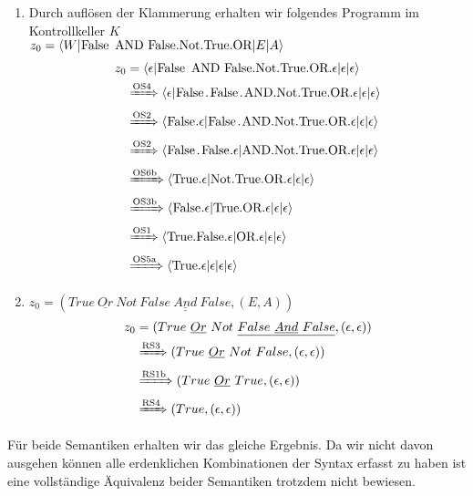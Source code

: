 \documentclass[ngerman,a4paper]{report}
\begin{document}
\begin{enumerate}
\begin{enumerate}
\item Durch auflösen der Klammerung erhalten wir folgendes Programm im Kontrollkeller $K$\\
$z_0=\langle W|\text{\lstinline!False AND False.Not.True.OR!}|E|A\rangle$
\begin{align*}
z_0&=\langle \epsilon|\text{\lstinline!False AND False.Not.True.OR!}.\epsilon|\epsilon|\epsilon\rangle \\
&\xRightarrow{\text{OS4}} \langle \epsilon|\text{\lstinline!False.False.AND.Not.True.OR!}.\epsilon|\epsilon|\epsilon\rangle\\
&\xRightarrow{\text{OS2}} \langle \text{\lstinline!False!}.\epsilon|\text{\lstinline!False.AND.Not.True.OR!}.\epsilon|\epsilon|\epsilon\rangle\\
&\xRightarrow{\text{OS2}} \langle \text{\lstinline!False.False!}.\epsilon|\text{\lstinline!AND.Not.True.OR!}.\epsilon|\epsilon|\epsilon\rangle\\
&\xRightarrow{\text{OS6b}} \langle \text{\lstinline!True!}.\epsilon|\text{\lstinline!Not.True.OR!}.\epsilon|\epsilon|\epsilon\rangle\\
&\xRightarrow{\text{OS3b}} \langle \text{\lstinline!False!}.\epsilon|\text{\lstinline!True.OR!}.\epsilon|\epsilon|\epsilon\rangle\\
&\xRightarrow{\text{OS1}} \langle \text{\lstinline!True.False!}.\epsilon|\text{\lstinline!OR!}.\epsilon|\epsilon|\epsilon\rangle\\
&\xRightarrow{\text{OS5a}} \langle \text{\lstinline!True!}.\epsilon|\epsilon|\epsilon|\epsilon\rangle\\
\end{align*}
\item $z_0=(True\ \underline{Or}\ Not\ \underline{False\ \underline{And}\ False}, (E,A))$\\
\begin{align*}
z_0&=(True\ \underline{Or}\ Not\ \underline{False\ \underline{And}\ False}, (\epsilon,\epsilon))\\
&\xRightarrow{\text{RS3}} (True\ \underline{Or}\ Not\ False, (\epsilon,\epsilon))\\
&\xRightarrow{\text{RS1b}} (True\ \underline{Or}\ True, (\epsilon,\epsilon))\\
&\xRightarrow{\text{RS4}} (True,(\epsilon,\epsilon))
\end{align*}
\end{enumerate}
\end{enumerate}
Für beide Semantiken erhalten wir das gleiche Ergebnis. Da wir nicht davon ausgehen können alle erdenklichen Kombinationen der Syntax erfasst zu haben ist eine vollständige Äquivalenz beider Semantiken trotzdem nicht bewiesen.\\
\end{document}
